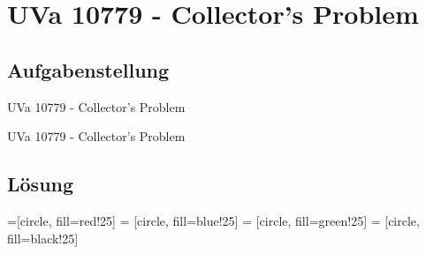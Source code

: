 
\section{UVa 10779 - Collector's Problem}
\subsection{Aufgabenstellung}
    \begin{frame}{UVa 10779 - Collector's Problem}
        \begin{block}{UVa 10779 - Collector's Problem}

        \end{block}

    \end{frame}

\subsection{Lösung}

=[circle, fill=red!25]
 = [circle, fill=blue!25]
 = [circle, fill=green!25]
 = [circle, fill=black!25]


